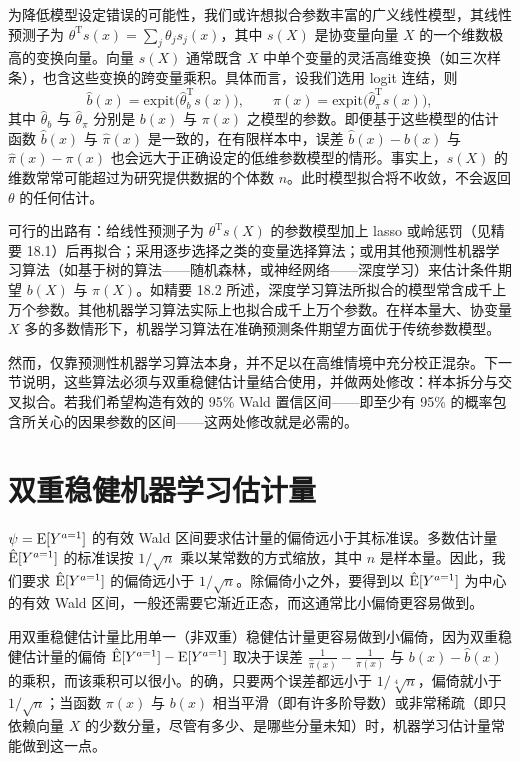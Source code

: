 为降低模型设定错误的可能性，我们或许想拟合参数丰富的广义线性模型，其线性预测子为 $\theta^{\mathrm{T}} s(x)=\sum_j \theta_j s_j(x)$，其中 $s(X)$ 是协变量向量 $X$ 的一个维数极高的变换向量。向量 $s(X)$ 通常既含 $X$ 中单个变量的灵活高维变换（如三次样条），也含这些变换的跨变量乘积。具体而言，设我们选用 logit 连结，则
\[
\hat b(x)=\mathrm{expit}\bigl(\hat\theta_b^{\mathrm{T}} s(x)\bigr),\qquad
\hat\pi(x)=\mathrm{expit}\bigl(\hat\theta_\pi^{\mathrm{T}} s(x)\bigr),
\]
其中 $\hat\theta_b$ 与 $\hat\theta_\pi$ 分别是 $b(x)$ 与 $\pi(x)$ 之模型的参数。即便基于这些模型的估计函数 $\hat b(x)$ 与 $\hat\pi(x)$ 是一致的，在有限样本中，误差 $\hat b(x)-b(x)$ 与 $\hat\pi(x)-\pi(x)$ 也会远大于正确设定的低维参数模型的情形。事实上，$s(X)$ 的维数常常可能超过为研究提供数据的个体数 $n$。此时模型拟合将不收敛，不会返回 $\theta$ 的任何估计。

可行的出路有：给线性预测子为 $\theta^{\mathrm{T}} s(X)$ 的参数模型加上 lasso 或岭惩罚（见精要 18.1）后再拟合；采用逐步选择之类的变量选择算法；或用其他预测性机器学习算法（如基于树的算法——随机森林，或神经网络——深度学习）来估计条件期望 $b(X)$ 与 $\pi(X)$。如精要 18.2 所述，深度学习算法所拟合的模型常含成千上万个参数。其他机器学习算法实际上也拟合成千上万个参数。在样本量大、协变量 $X$ 多的多数情形下，机器学习算法在准确预测条件期望方面优于传统参数模型。

然而，仅靠预测性机器学习算法本身，并不足以在高维情境中充分校正混杂。下一节说明，这些算法必须与双重稳健估计量结合使用，并做两处修改：样本拆分与交叉拟合。若我们希望构造有效的 95\% Wald 置信区间——即至少有 95\% 的概率包含所关心的因果参数的区间——这两处修改就是必需的。

\section{双重稳健机器学习估计量}

$\psi=\mathrm{E}[Y^{a=1}]$ 的有效 Wald 区间要求估计量的偏倚远小于其标准误。多数估计量 $\hat{\mathrm{E}}[Y^{a=1}]$ 的标准误按 $1/\sqrt{n}$ 乘以某常数的方式缩放，其中 $n$ 是样本量。因此，我们要求 $\hat{\mathrm{E}}[Y^{a=1}]$ 的偏倚远小于 $1/\sqrt{n}$。除偏倚小之外，要得到以 $\hat{\mathrm{E}}[Y^{a=1}]$ 为中心的有效 Wald 区间，一般还需要它渐近正态，而这通常比小偏倚更容易做到。

用双重稳健估计量比用单一（非双重）稳健估计量更容易做到小偏倚，因为双重稳健估计量的偏倚 $\hat{\mathrm{E}}[Y^{a=1}]-\mathrm{E}[Y^{a=1}]$ 取决于误差 $\frac{1}{\hat\pi(x)}-\frac{1}{\pi(x)}$ 与 $b(x)-\hat b(x)$ 的乘积，而该乘积可以很小。的确，只要两个误差都远小于 $1/\sqrt[4]{n}$，偏倚就小于 $1/\sqrt{n}$；当函数 $\pi(x)$ 与 $b(x)$ 相当平滑（即有许多阶导数）或非常稀疏（即只依赖向量 $X$ 的少数分量，尽管有多少、是哪些分量未知）时，机器学习估计量常能做到这一点。

